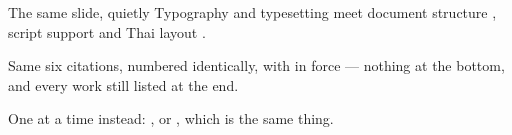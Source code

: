 \begin{frame}{The same slide, quietly}
  \deckcitefootoff   %
  Typography \cite{bringhurst2012} and typesetting \cite{knuth1984,lamport1994}
  meet document structure \cite{mittelbach2021}, script support
  \cite{unicode2024} and Thai layout \cite{tantisiriwat2020}.

  \vspace{0.6em}
  Same six citations, numbered identically, with
   in force --- nothing at the bottom, and
  every work still listed at the end.

  \vspace{0.6em}
  One at a time instead: , or
  , which is the same thing.
\end{frame}

